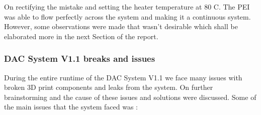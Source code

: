 On rectifying the mistake and setting the heater temperature at 80 \degree C. The PEI was able to flow perfectly across the system and making it a continuous system. However, some observations were made that wasn't desirable which shall be elaborated more in the next Section of the report. 

\subsubsection{DAC System V1.1 breaks and issues}
\label{sec:breakdown}

During the entire runtime of the DAC System V1.1 we face many issues with broken 3D print components and leaks from the system. On further brainstorming and the cause of these issues and solutions were discussed. Some of the main issues that the system faced was : 

